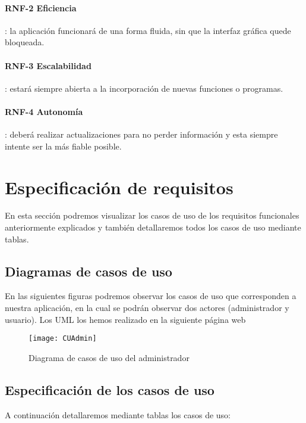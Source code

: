 \paragraph{RNF-2 Eficiencia}: la aplicación funcionará de una forma fluida, sin que la interfaz gráfica quede bloqueada.

\paragraph{RNF-3 Escalabilidad}: estará siempre abierta a la incorporación de nuevas funciones o programas.

\paragraph{RNF-4 Autonomía}: deberá realizar actualizaciones para no perder información y esta siempre intente ser la más fiable posible.

\section{Especificación de requisitos}

En esta sección podremos visualizar los casos de uso de los requisitos funcionales anteriormente explicados y también detallaremos todos los casos de uso mediante tablas.

\subsection{Diagramas de casos de uso}
En las siguientes figuras podremos observar los casos de uso que corresponden a nuestra aplicación, en la cual se podrán observar dos actores (administrador y usuario). Los UML los hemos realizado en la siguiente página web \cite{uml}

\begin{figure}[h!]
    \centering
    \texttt{[image: CUAdmin]}
    \caption{Diagrama de casos de uso del administrador}
\end{figure}


\subsection{Especificación de los casos de uso}

A continuación detallaremos mediante tablas los casos de uso:

